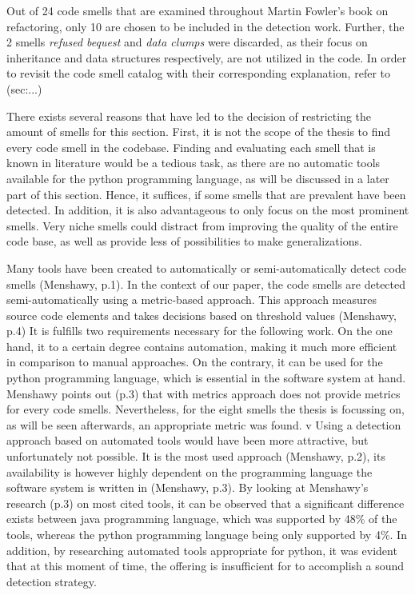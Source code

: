 Out of 24 code smells that are examined throughout Martin Fowler's book on refactoring, only 10 are chosen to be included in the detection work. Further, the 2 smells \emph{refused bequest} and \emph{data clumps} were discarded, as their focus on inheritance and data structures respectively, are not utilized in the code. In order to revisit the code smell catalog with their corresponding explanation, refer to (sec:...)
 

There exists several reasons that have led to the decision of restricting the amount of smells for this section. First, it is not the scope of the thesis to find every code smell in the codebase. Finding and evaluating each smell that is known in literature would be a tedious task, as there are no automatic tools available for the python programming language, as will be discussed in a later part of this section. Hence, it suffices, if some smells that are prevalent have been detected. In addition, it is also advantageous to only focus on the most prominent smells. Very niche smells could distract from improving the quality of the entire code base, as well as provide less of possibilities to make generalizations.

Many tools have been created to automatically or semi-automatically detect code smells (Menshawy, p.1). In the context of our paper, the code smells are detected semi-automatically using a metric-based approach. This approach measures source code elements and takes decisions based on threshold values (Menshawy, p.4) It is fulfills two requirements necessary for the following work. On the one hand, it to a certain degree contains automation, making it much more efficient in comparison to manual approaches. On the contrary, it can be used for the python programming language, which is essential in the software system at hand. Menshawy points out (p.3) that with metrics approach does not provide metrics for every code smells. Nevertheless, for the eight smells the thesis is focussing on, as will be seen afterwards, an appropriate metric was found.
v
Using a detection approach based on automated tools would have been more attractive, but unfortunately not possible.  It is the most used approach (Menshawy, p.2), its availability is however highly dependent on the programming language the software system is written in (Menshawy, p.3). By looking at Menshawy's research (p.3) on most cited tools, it can be observed that a significant difference exists between java programming language, which was supported  by 48\% of the tools, whereas the python programming language being only supported by 4\%.
In addition, by researching automated tools appropriate for python, it was evident that at this moment of time, the offering is insufficient for to accomplish a sound detection strategy. 

